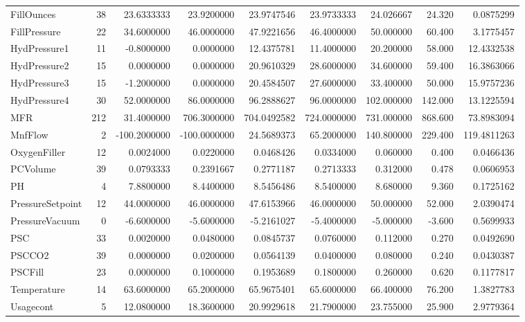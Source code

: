 \documentclass[]{report}
\begin{document}
\begin{table}[H]
\begin{tabular}[t]{lrrrrrrrr}
\rowcolor{gray!6}  FillOunces & 38 & 23.6333333 & 23.9200000 & 23.9747546 & 23.9733333 & 24.026667 & 24.320 & 0.0875299\\
\addlinespace
FillPressure & 22 & 34.6000000 & 46.0000000 & 47.9221656 & 46.4000000 & 50.000000 & 60.400 & 3.1775457\\
\rowcolor{gray!6}  HydPressure1 & 11 & -0.8000000 & 0.0000000 & 12.4375781 & 11.4000000 & 20.200000 & 58.000 & 12.4332538\\
HydPressure2 & 15 & 0.0000000 & 0.0000000 & 20.9610329 & 28.6000000 & 34.600000 & 59.400 & 16.3863066\\
\rowcolor{gray!6}  HydPressure3 & 15 & -1.2000000 & 0.0000000 & 20.4584507 & 27.6000000 & 33.400000 & 50.000 & 15.9757236\\
HydPressure4 & 30 & 52.0000000 & 86.0000000 & 96.2888627 & 96.0000000 & 102.000000 & 142.000 & 13.1225594\\
\addlinespace
\rowcolor{gray!6}  MFR & 212 & 31.4000000 & 706.3000000 & 704.0492582 & 724.0000000 & 731.000000 & 868.600 & 73.8983094\\
MnfFlow & 2 & -100.2000000 & -100.0000000 & 24.5689373 & 65.2000000 & 140.800000 & 229.400 & 119.4811263\\
\rowcolor{gray!6}  OxygenFiller & 12 & 0.0024000 & 0.0220000 & 0.0468426 & 0.0334000 & 0.060000 & 0.400 & 0.0466436\\
PCVolume & 39 & 0.0793333 & 0.2391667 & 0.2771187 & 0.2713333 & 0.312000 & 0.478 & 0.0606953\\
\rowcolor{gray!6}  PH & 4 & 7.8800000 & 8.4400000 & 8.5456486 & 8.5400000 & 8.680000 & 9.360 & 0.1725162\\
\addlinespace
PressureSetpoint & 12 & 44.0000000 & 46.0000000 & 47.6153966 & 46.0000000 & 50.000000 & 52.000 & 2.0390474\\
\rowcolor{gray!6}  PressureVacuum & 0 & -6.6000000 & -5.6000000 & -5.2161027 & -5.4000000 & -5.000000 & -3.600 & 0.5699933\\
PSC & 33 & 0.0020000 & 0.0480000 & 0.0845737 & 0.0760000 & 0.112000 & 0.270 & 0.0492690\\
\rowcolor{gray!6}  PSCCO2 & 39 & 0.0000000 & 0.0200000 & 0.0564139 & 0.0400000 & 0.080000 & 0.240 & 0.0430387\\
PSCFill & 23 & 0.0000000 & 0.1000000 & 0.1953689 & 0.1800000 & 0.260000 & 0.620 & 0.1177817\\
\addlinespace
\rowcolor{gray!6}  Temperature & 14 & 63.6000000 & 65.2000000 & 65.9675401 & 65.6000000 & 66.400000 & 76.200 & 1.3827783\\
Usagecont & 5 & 12.0800000 & 18.3600000 & 20.9929618 & 21.7900000 & 23.755000 & 25.900 & 2.9779364\\
\bottomrule
\end{tabular}
\end{table}
\end{document}
